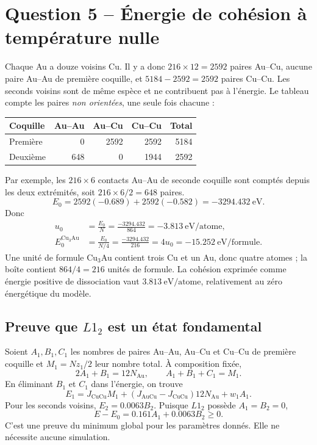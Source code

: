 \documentclass[10pt,a4paper]{article}
\newcommand{\Au}{\mathrm{Au}}
\newcommand{\Cu}{\mathrm{Cu}}
\begin{document}
\section{Question 5 -- Énergie de cohésion à température nulle}
Chaque Au a douze voisins Cu. Il y a donc $216\times12=2592$ paires Au--Cu,
aucune paire Au--Au de première coquille, et $5184-2592=2592$ paires Cu--Cu.
Les seconds voisins sont de même espèce et ne contribuent pas à l'énergie.
Le tableau compte les paires \emph{non orientées}, une seule fois chacune :
\begin{center}\small
\begin{tabular}{lrrrr}\toprule
Coquille & Au--Au & Au--Cu & Cu--Cu & Total\\\midrule
Première & 0 & 2592 & 2592 & 5184\\
Deuxième & 648 & 0 & 1944 & 2592\\\bottomrule
\end{tabular}\end{center}
Par exemple, les $216\times6$ contacts Au--Au de seconde coquille sont
comptés depuis les deux extrémités, soit $216\times6/2=648$ paires.
\[
E_0=2592(-0.689)+2592(-0.582)=-3294.432\ \mathrm{eV}.
\]
Donc
\begin{equation}
\begin{aligned}
u_0&=\frac{E_0}{N}=\frac{-3294.432}{864}
=\boxed{-3.813\ \mathrm{eV/atome}},\\
E_0^{\Cu_3\Au}&=\frac{E_0}{N/4}=\frac{-3294.432}{216}=4u_0
=\boxed{-15.252\ \mathrm{eV/formule}}.
\end{aligned}
\end{equation}
Une unité de formule Cu$_3$Au contient trois Cu et un Au, donc quatre
atomes ; la boîte contient $864/4=216$ unités de formule.
La cohésion exprimée comme énergie positive de dissociation vaut
$3.813\ \mathrm{eV/atome}$, relativement au zéro énergétique du modèle.

\subsection{Preuve que \texorpdfstring{$L1_2$}{L12} est un état fondamental}
Soient $A_1,B_1,C_1$ les nombres de paires Au--Au, Au--Cu et Cu--Cu de
première coquille et $M_1=Nz_1/2$ leur nombre total. À composition fixée,
\[
2A_1+B_1=12N_{\Au},\qquad A_1+B_1+C_1=M_1.
\]
En éliminant $B_1$ et $C_1$ dans l'énergie, on trouve
\[
E_1=J_{\Cu\Cu}M_1+(J_{\Au\Cu}-J_{\Cu\Cu})12N_{\Au}+w_1A_1.
\]
Pour les seconds voisins, $E_2=0.0063B_2$. Puisque $L1_2$ possède
$A_1=B_2=0$,
\begin{equation}
\boxed{E-E_0=0.161A_1+0.0063B_2\ge0.}
\end{equation}
C'est une preuve du minimum global pour les paramètres donnés. Elle ne
nécessite aucune simulation.
\end{document}
